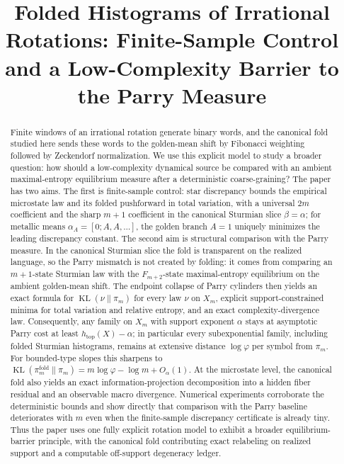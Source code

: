 \documentclass[11pt,letterpaper]{article}
\title{Folded Histograms of Irrational Rotations: Finite-Sample Control and a Low-Complexity Barrier to the Parry Measure}
\author{}
\date{}
\numberwithin{equation}{section}
\theoremstyle{plain}
\theoremstyle{definition}
\theoremstyle{remark}
\DeclareMathOperator{\KL}{KL}
\begin{document}
\maketitle

\begin{abstract}
Finite windows of an irrational rotation generate binary words, and the
canonical fold studied here sends these words to the golden-mean shift by
Fibonacci weighting followed by Zeckendorf normalization. We use this explicit
model to study a broader question: how should a low-complexity dynamical source
be compared with an ambient maximal-entropy equilibrium measure after a
deterministic coarse-graining? The paper has two aims. The first is
finite-sample control: star discrepancy bounds the empirical microstate law and
its folded pushforward in total variation, with a universal \(2m\) coefficient
and the sharp \(m+1\) coefficient in the canonical Sturmian slice
\(\beta=\alpha\); for metallic means \(\alpha_A=[0;A,A,\dots]\), the golden
branch \(A=1\) uniquely minimizes the leading discrepancy constant. The second
aim is structural comparison with the Parry measure. In the canonical Sturmian
slice the fold is transparent on the realized language, so the Parry mismatch is
not created by folding: it comes from comparing an \(m+1\)-state Sturmian law
with the \(F_{m+2}\)-state maximal-entropy equilibrium on the ambient
golden-mean shift. The endpoint collapse of Parry cylinders then yields an exact
formula for \(\KL(\nu\|\pi_m)\) for every law \(\nu\) on \(X_m\), explicit
support-constrained minima for total variation and relative entropy, and an
exact complexity-divergence law. Consequently, any family on \(X_m\) with
support exponent \(\alpha\) stays at asymptotic Parry cost at least
\(h_{\mathrm{top}}(X)-\alpha\); in particular every subexponential family,
including folded Sturmian histograms, remains at extensive distance
\(\log\varphi\) per symbol from \(\pi_m\). For bounded-type slopes this sharpens
to \(\KL(\pi_m^{\mathrm{fold}}\|\pi_m)=m\log\varphi-\log m+O_\alpha(1)\). At the
microstate level, the canonical fold also yields an exact information-projection
decomposition into a hidden fiber residual and an observable macro divergence.
Numerical experiments corroborate the deterministic bounds and show directly
that comparison with the Parry baseline deteriorates with \(m\) even when the
finite-sample discrepancy certificate is already tiny. Thus the paper uses one
fully explicit rotation model to exhibit a broader equilibrium-barrier
principle, with the canonical fold contributing exact relabeling on realized
support and a computable off-support degeneracy ledger.
\end{abstract}
\end{document}
